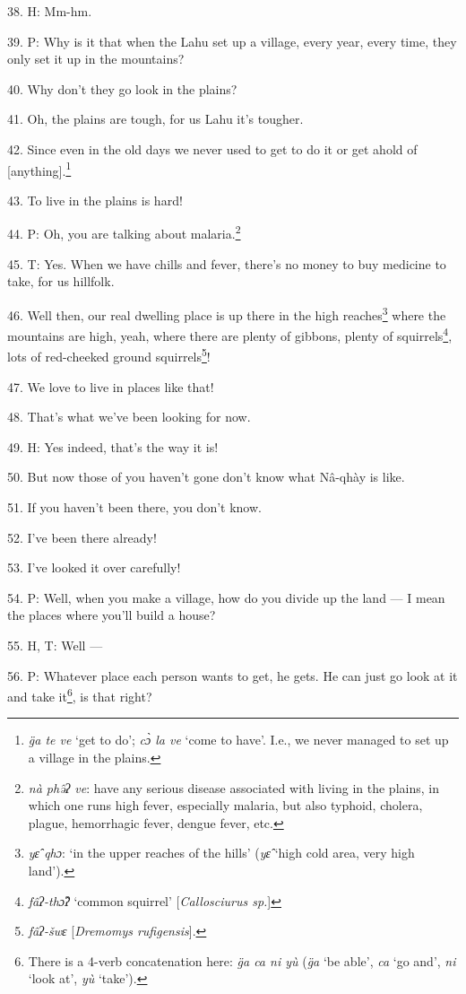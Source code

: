 38. H: Mm-hm.

39. P: Why is it that when the Lahu set up a village, every year, every time, they
only set it up in the mountains?

40. Why don't they go look in the plains?

41. Oh, the plains are tough, for us Lahu it's tougher.

42. Since even in the old days we never used to get to do it or get ahold of [anything].\footnote{\textit{g̈a te ve} `get to do'; \textit{cɔ̀ la ve} `come to have'. I.e., we never managed to set up a village in the plains.}

43. To live in the plains is hard!

44. P: Oh, you are talking about malaria.\footnote{\textit{nà phə̂ʔ ve}: have any serious disease associated with living in the plains, in which one runs high fever, especially malaria, but also typhoid, cholera, plague, hemorrhagic fever, dengue fever, etc.}

45. T: Yes. When we have chills and fever, there's no money to buy medicine to
take, for us hillfolk.

46. Well then, our real dwelling place is up there in the high reaches\footnote{\textit{yɛ̂ qhɔ}: `in the upper reaches of the hills' (\textit{yɛ̂} `high cold area, very high land').} where
the mountains are high, yeah, where there are plenty of gibbons, plenty of squirrels\footnote{\textit{fâʔ-thɔ̂ʔ} `common squirrel' [\textit{Callosciurus sp.}]},
lots of red-cheeked ground squirrels\footnote{\textit{fâʔ-šwɛ} [\textit{Dremomys rufigensis}].}!

47. We love to live in places like that!

48. That's what we've been looking for now.

49. H: Yes indeed, that's the way it is!

50. But now those of you haven't gone don't know what Nâ-qhày is like.

51. If you haven't been there, you don't know.

52. I've been there already!

53. I've looked it over carefully!

54. P: Well, when you make a village, how do you divide up the land --- I mean
the places where you'll build a house?

55. H, T: Well ---

56. P: Whatever place each person wants to get, he gets. He can just go look at
it and take it\footnote{There is a 4-verb concatenation here: \textit{g̈a ca ni yù} (\textit{g̈a} `be able', \textit{ca} `go and', \textit{ni} `look at', \textit{yù} `take').}, is that right?

